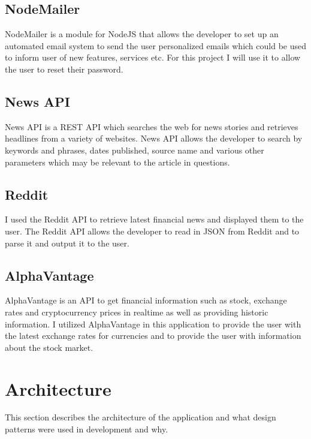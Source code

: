 \subsection{NodeMailer}
NodeMailer is a module for NodeJS that allows the developer to set up an automated email system to send the user personalized emails which could be used to inform user of new features, services etc. For this project I will use it to allow the user to reset their password.
\subsection{News API}
News API is a REST API which searches the web for news stories and retrieves headlines from a variety of websites\cite{NewsAPI}.  News API allows the developer to search by keywords and phrases, dates published, source name and various other parameters which may be relevant to the article in questions.
\subsection{Reddit}
I used the Reddit API to retrieve latest financial news and displayed them to the user.  The Reddit API allows the developer to read in JSON from Reddit and to parse it and output it to the user.
\subsection{AlphaVantage}
AlphaVantage is an API to get financial information such as stock, exchange rates and cryptocurrency prices in realtime as well as providing historic information.  I utilized AlphaVantage in this application to provide the user with the latest exchange rates for currencies and to provide the user with information about the stock market.

\section{Architecture}
This section describes the architecture of the application and what design patterns were used in development and why.
